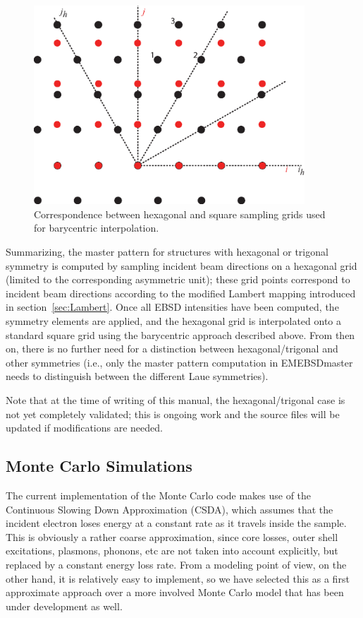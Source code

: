 \documentclass[DIV=calc, paper=letter, fontsize=11pt]{scrartcl}	 %
\begin{document}
\begin{figure}[h]
\centering
\includegraphics[width=4in]{figs/bary}
\caption{Correspondence between hexagonal and square sampling grids used for barycentric interpolation.} \label{fig:bary}
\end{figure}

Summarizing, the master pattern for structures with hexagonal or trigonal symmetry is computed by sampling incident beam directions
on a hexagonal grid (limited to the corresponding asymmetric unit); these grid points correspond to incident beam directions according 
to the modified Lambert mapping introduced in section~\ref{sec:Lambert}.  Once all EBSD intensities have been computed, the symmetry
elements are applied, and the hexagonal grid is interpolated onto a standard square grid using the barycentric approach described above.
From then on, there is no further need for a distinction between hexagonal/trigonal and other symmetries (i.e., only the master pattern
computation in \textsf{EMEBSDmaster} needs to distinguish between the different Laue symmetries).

{\color{blue}Note that at the time of writing of this manual, the hexagonal/trigonal case is not yet completely validated; this is ongoing work
and the source files will be updated if modifications are needed.}

\newpage
\subsection{Monte Carlo Simulations \label{sec:MC}}
The current implementation of the Monte Carlo code makes use of the Continuous Slowing Down Approximation (CSDA),
which assumes that the incident electron loses energy at a constant rate as it travels inside the sample.  This is obviously a
rather coarse approximation, since core losses, outer shell excitations, plasmons, phonons, etc are not taken into account
explicitly, but replaced by a constant energy loss rate.  From a modeling point of view, on the other hand, it is relatively easy
to implement, so we have selected this as a first approximate approach over a more involved Monte Carlo model that has been
under development as well.  
\end{document}
